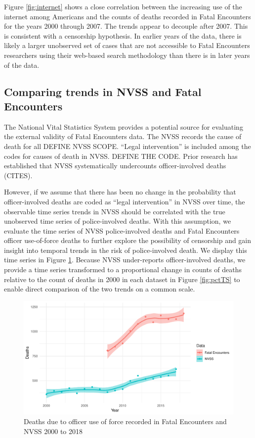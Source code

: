 \documentclass{article}
\begin{document}
Figure \ref{fig:internet} shows a close correlation between the increasing use of the internet among Americans and the counts of deaths recorded in Fatal Encounters for the years 2000 through 2007. The trends appear to decouple after 2007. This is consistent with a censorship hypothesis. In earlier years of the data, there is likely a larger unobserved set of cases that are not accessible to Fatal Encounters researchers using their web-based search methodology than there is in later years of the data.

\subsection{Comparing trends in NVSS and Fatal Encounters}

The National Vital Statistics System provides a potential source for evaluating the external validity of Fatal Encounters data. The NVSS records the cause of death for all DEFINE NVSS SCOPE. ``Legal intervention'' is included among the codes for causes of death in NVSS. DEFINE THE CODE. Prior research has established that NVSS systematically undercounts officer-involved deaths (CITES). 

However, if we assume that there has been no change in the probability that officer-involved deaths are coded as ``legal intervention'' in NVSS over time, the observable time series trends in NVSS should be correlated with the true unobserved time series of police-involved deaths. With this assumption, we evaluate the time series of NVSS police-involved deaths and Fatal Encounters officer use-of-force deaths to further explore the possibility of censorship and gain insight into temporal trends in the risk of police-involved death. We display this time series in Figure \ref{fig:countTS}. Because NVSS under-reports officer-involved deaths, we provide a time series transformed to a proportional change in counts of deaths relative to the count of deaths in 2000 in each dataset in Figure \ref{fig:pctTS} to enable direct comparison of the two trends on a common scale. 

\begin{figure}
	\centering
	\includegraphics[width = \linewidth]{vis/nvss_fe_ts.pdf}
	\caption{Deaths due to officer use of force recorded in Fatal Encounters and NVSS 2000 to 2018}
	\label{fig:countTS}
\end{figure}
\end{document}
